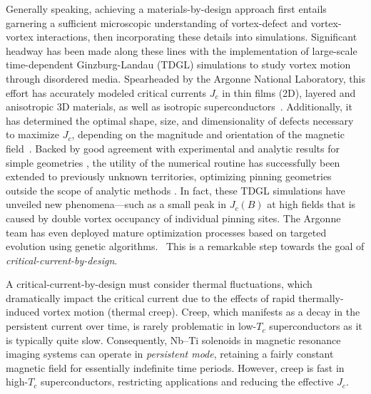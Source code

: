 \documentclass[%
 aip,
 amsmath,amssymb,
 reprint,%
floatfix]{revtex4-1}
\newcommand{\Tc}{T_{c}}
\newcommand{\Jc}{J_{c}}
\begin{document}
Generally speaking, achieving a materials-by-design approach first entails garnering a sufficient microscopic understanding of vortex-defect and vortex-vortex interactions, then incorporating these details into simulations. Significant headway has been made along these lines with the implementation of large-scale time-dependent Ginzburg-Landau (TDGL) simulations to study vortex motion through disordered media. Spearheaded by the Argonne National Laboratory, this effort has accurately modeled critical currents $\Jc$ in thin films (2D), layered and anisotropic 3D materials, as well as isotropic superconductors~\cite{Sadovskyy2015a,Sadovskyy2016a,Glatz2016,Sadovskyy2017,kimmel2019}. 
Additionally, it has determined the optimal shape, size, and dimensionality of defects necessary to maximize $\Jc$, depending on the magnitude and orientation of the magnetic field~\cite{Koshelev2016,Sadovskyy2016b,Kimmel2017,Sadovskyy2019}. Backed by good agreement with experimental and analytic results for simple geometries \cite{Willa2015a, Willa2015b, Willa2016, Willa2018c}, the utility of the numerical routine has successfully been extended to previously unknown territories, optimizing pinning geometries outside the scope of analytic methods \cite{Glatz2016, Kimmel2017, Koshelev2016, Kwok2016,Papari2016, Sadovskyy2015a, Sadovskyy2016a, Sadovskyy2016b, Sadovskyy2019, Willa2018b,ted100}. In fact, these TDGL simulations have unveiled new phenomena---such as a small peak in $\Jc(B)$ at high fields that is caused by double vortex occupancy of individual pinning sites.\cite{Willa2018a}  The Argonne team has even deployed mature optimization processes based on targeted evolution using genetic algorithms.~\cite{Sadovskyy2019}  This is a remarkable step towards the goal of \textit{critical-current-by-design}.



A critical-current-by-design must consider thermal fluctuations, which dramatically impact the critical current due to the effects of rapid thermally-induced vortex motion (thermal creep). Creep, which manifests as a decay in the persistent current over time, is rarely problematic in low-$\Tc$ superconductors as it is typically quite slow. Consequently, Nb--Ti solenoids in magnetic resonance imaging systems can operate in \textit{persistent mode}, retaining a fairly constant magnetic field for essentially indefinite time periods. However, creep is fast in high-$\Tc$ superconductors, restricting applications and reducing the effective $\Jc$.
\end{document}
